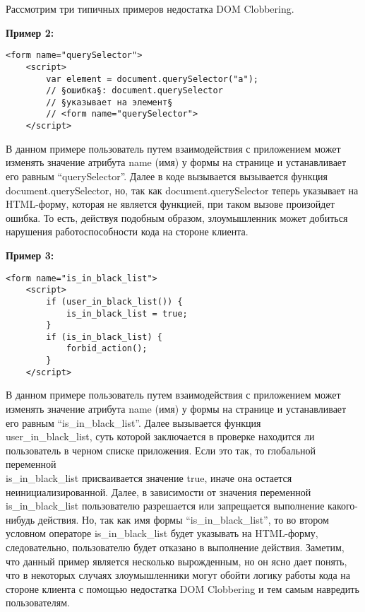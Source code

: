 Рассмотрим три типичных примеров недостатка DOM Clobbering.

\bigskip
\textbf{Пример 2:}


\begin{lstlisting}[caption=вызов ошибки]
	<form name="querySelector">
	<script>
		var element = document.querySelector("a"); 
		// §ошибка§: document.querySelector 
		// §указывает на элемент§
		// <form name="querySelector">
	</script>
\end{lstlisting}
\bigskip

В данном примере пользователь путем взаимодействия с приложением может изменять значение атрибута name (имя) у формы на странице и устанавливает его равным “querySelector”. Далее в коде вызывается вызывается функция document.querySelector, но, так как document.querySelector теперь указывает на \\HTML-форму, которая не является функцией, при таком вызове произойдет ошибка.
То есть, действуя подобным образом, злоумышленник может добиться нарушения работоспособности кода на стороне клиента.

\bigskip
\textbf{Пример 3:}

\begin{lstlisting}[caption=обход логики программы]
	<form name="is_in_black_list">
	<script>
		if (user_in_black_list()) {
			is_in_black_list = true;
		}
		if (is_in_black_list) {
			forbid_action();
		}
	</script>
\end{lstlisting}
\bigskip

В данном примере пользователь путем взаимодействия с приложением может изменять значение атрибута name (имя) у формы на странице и устанавливает его равным “is\_in\_black\_list”. Далее вызывается функция \\user\_in\_black\_list, суть которой заключается в проверке находится ли пользователь в черном списке приложения. Если это так, то глобальной переменной \\is\_in\_black\_list присваивается значение true, иначе она остается неинициализированной. Далее, в зависимости от значения переменной is\_in\_black\_list пользователю разрешается или запрещается выполнение какого-нибудь действия. Но, так как имя формы  “is\_in\_black\_list”, то во втором условном операторе is\_in\_black\_list будет указывать на HTML-форму, следовательно, пользователю будет отказано в выполнение действия.
Заметим, что данный пример является несколько вырожденным, но он ясно дает понять, что в некоторых случаях злоумышленники могут обойти логику работы кода на стороне клиента с помощью недостатка DOM Clobbering и тем самым навредить пользователям.


